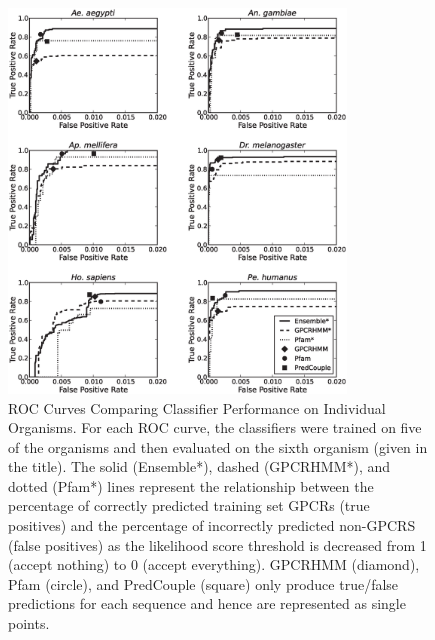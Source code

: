 \begin{figure}[H]
\centering
\includegraphics[width=0.8\textwidth]{figures/gpcr_classifier/organism_ensembl_roc.eps}
\caption{ROC Curves Comparing Classifier Performance on Individual Organisms.  For each ROC curve, the classifiers were trained on five of the organisms and then evaluated on the sixth organism (given in the title).  The solid (Ensemble*), dashed (GPCRHMM*), and dotted (Pfam*) lines represent the relationship between the percentage of correctly predicted training set GPCRs (true positives) and the percentage of incorrectly predicted non-GPCRS (false positives) as the likelihood score threshold is decreased from 1 (accept nothing) to 0 (accept everything).  GPCRHMM (diamond), Pfam (circle), and PredCouple (square) only produce true/false predictions for each sequence and hence are represented as single points.}
\label{fig:individual-roc-curves}
\end{figure}

